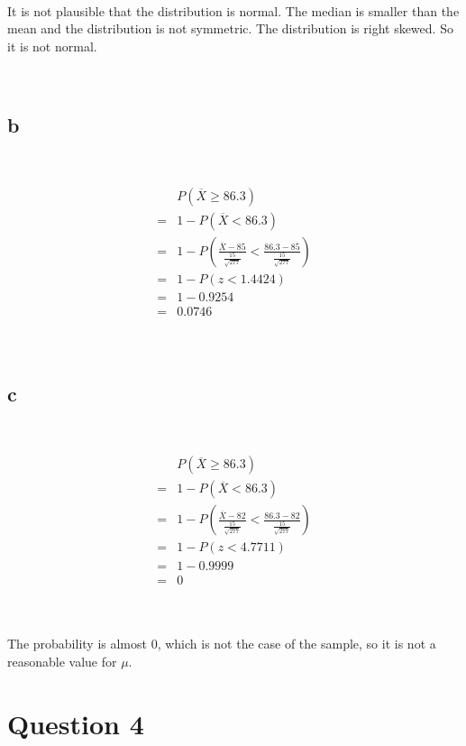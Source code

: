 \documentclass{article}
\begin{document}
~

It is not plausible that the distribution is normal. The median is smaller than the mean and the distribution is not symmetric. The distribution is right skewed. So it is not normal.

~

\subsection*{b}

~

\begin{align*}
    &P(\overline{X}\geqslant 86.3)\\
    =&1-P(\overline{X}<86.3)\\
    =&1-P(\frac{\overline{X}-85}{\frac{15}{\sqrt{277}}}<\frac{86.3-85}{\frac{15}{\sqrt{277}}})\\
    =&1-P(z<1.4424)\\
    =&1-0.9254\\
    =&0.0746\\
\end{align*}

~

\subsection*{c}

~

\begin{align*}
    &P(\overline{X}\geqslant 86.3)\\
    =&1-P(\overline{X}<86.3)\\
    =&1-P(\frac{\overline{X}-82}{\frac{15}{\sqrt{277}}}<\frac{86.3-82}{\frac{15}{\sqrt{277}}})\\
    =&1-P(z<4.7711)\\
    =&1-0.9999\\
    =&0\\
\end{align*}

~

The probability is almost 0, which is not the case of the sample, so it is not a reasonable value for $\mu$.

\newpage

\section*{Question 4}

~
\end{document}
